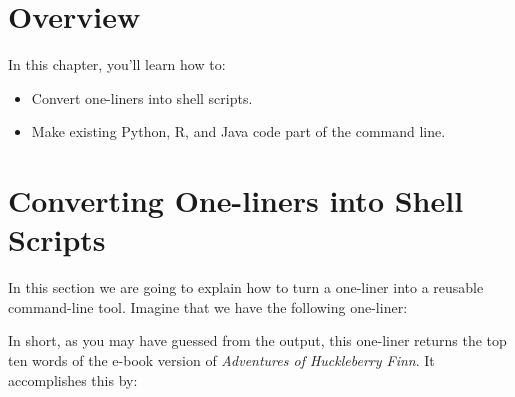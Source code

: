 \documentclass[
]{book}
\newenvironment{Shaded}{\begin{snugshade}}{\end{snugshade}}
\newcommand{\ExtensionTok}[1]{#1}
\newcommand{\FunctionTok}[1]{\textcolor[rgb]{0.00,0.00,0.00}{#1}}
\newcommand{\KeywordTok}[1]{\textcolor[rgb]{0.13,0.29,0.53}{\textbf{#1}}}
\newcommand{\NormalTok}[1]{#1}
\newcommand{\OperatorTok}[1]{\textcolor[rgb]{0.81,0.36,0.00}{\textbf{#1}}}
\newcommand{\StringTok}[1]{\textcolor[rgb]{0.31,0.60,0.02}{#1}}
\providecommand{\tightlist}{%
  \setlength{\itemsep}{0pt}\setlength{\parskip}{0pt}}
\theoremstyle{definition}
\theoremstyle{definition}
\theoremstyle{definition}
\theoremstyle{remark}
\begin{document}
\hypertarget{overview}{%
\section{Overview}\label{overview}}

In this chapter, you'll learn how to:

\begin{itemize}
\tightlist
\item
  Convert one-liners into shell scripts.
\item
  Make existing Python, R, and Java code part of the command line.
\end{itemize}

\hypertarget{converting-one-liners-into-shell-scripts}{%
\section{Converting One-liners into Shell Scripts}\label{converting-one-liners-into-shell-scripts}}

In this section we are going to explain how to turn a one-liner into a reusable command-line tool. Imagine that we have the following one-liner:

\begin{Shaded}
\end{Shaded}

In short, as you may have guessed from the output, this one-liner returns the top ten words of the e-book version of \emph{Adventures of Huckleberry Finn}. It accomplishes this by:
\end{document}
